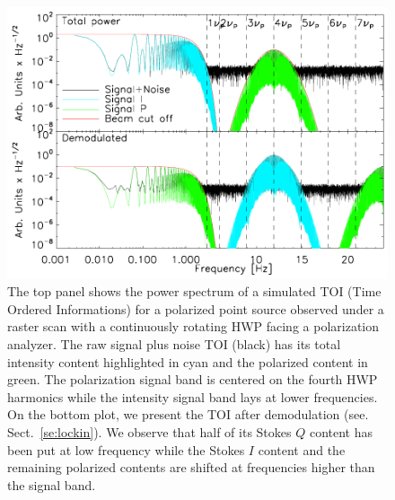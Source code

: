 \documentclass[twocolumn, traditabstract]{aa}
\begin{document}
\begin{figure}
\includegraphics[width=1.\linewidth,keepaspectratio]{figures/toi_simu.pdf}
\caption{The top panel shows the power spectrum of a simulated 
  TOI (Time Ordered Informations) for a polarized point source observed under a
  raster scan with a continuously rotating HWP facing
  a polarization analyzer. The raw signal plus noise TOI (black) has its total
  intensity content highlighted in cyan and the polarized content in green. The
  polarization signal band is centered on the fourth HWP harmonics while the
  intensity signal band lays at lower frequencies. On the bottom plot, we
  present the TOI after demodulation (see. Sect.~\ref{se:lockin}). We observe
  that half of its Stokes $Q$ content has been put at low frequency while the
  Stokes $I$ content and the remaining polarized contents are shifted at
  frequencies higher than the signal band.}
   \label{fig:toi_simu}
\end{figure}  
\end{document}
